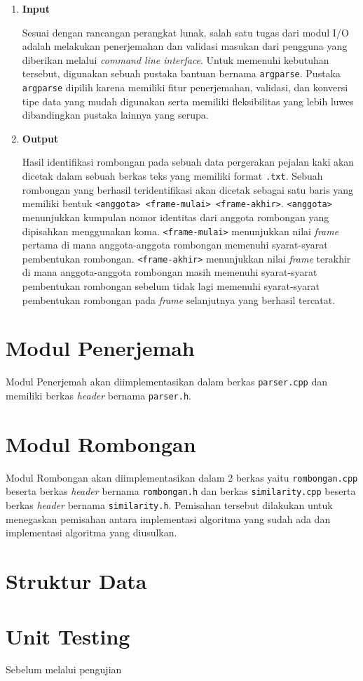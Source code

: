 \begin{enumerate}
    \item \textbf{Input}
    
    Sesuai dengan rancangan perangkat lunak, salah satu tugas dari modul I/O adalah melakukan penerjemahan dan validasi masukan dari pengguna yang diberikan melalui \textit{command line interface}. Untuk memenuhi kebutuhan tersebut, digunakan sebuah pustaka bantuan bernama \texttt{argparse}. Pustaka \texttt{argparse} dipilih karena memiliki fitur penerjemahan, validasi, dan konversi tipe data yang mudah digunakan serta memiliki fleksibilitas yang lebih luwes dibandingkan pustaka lainnya yang serupa.
    
    \item \textbf{Output}
    
    Hasil identifikasi rombongan pada sebuah data pergerakan pejalan kaki akan dicetak dalam sebuah berkas teks yang memiliki format \texttt{.txt}. Sebuah rombongan yang berhasil teridentifikasi akan dicetak sebagai satu baris yang memiliki bentuk \texttt{<anggota> <frame-mulai> <frame-akhir>}. \texttt{<anggota>} menunjukkan kumpulan nomor identitas dari anggota rombongan yang dipisahkan menggunakan koma. \texttt{<frame-mulai>} menunjukkan nilai \textit{frame} pertama di mana anggota-anggota rombongan memenuhi syarat-syarat pembentukan rombongan. \texttt{<frame-akhir>} menunjukkan nilai \textit{frame} terakhir di mana anggota-anggota rombongan masih memenuhi syarat-syarat pembentukan rombongan sebelum tidak lagi memenuhi syarat-syarat pembentukan rombongan pada \textit{frame} selanjutnya yang berhasil tercatat.
\end{enumerate}

\section{Modul Penerjemah}
\label{sec:impl-parser}

Modul Penerjemah akan diimplementasikan dalam berkas \texttt{parser.cpp} dan memiliki berkas \textit{header} bernama \texttt{parser.h}. 

\section{Modul Rombongan}
\label{sec:impl-rombongan}

Modul Rombongan akan diimplementasikan dalam 2 berkas yaitu \texttt{rombongan.cpp} beserta berkas \textit{header} bernama \texttt{rombongan.h} dan berkas \texttt{similarity.cpp} beserta berkas \textit{header} bernama \texttt{similarity.h}. Pemisahan tersebut dilakukan untuk menegaskan pemisahan antara implementasi algoritma yang sudah ada dan implementasi algoritma yang diusulkan.

\section{Struktur Data}
\label{sec:impl-struct}

\section{Unit Testing}
\label{sec:unit-test}

Sebelum melalui pengujian 